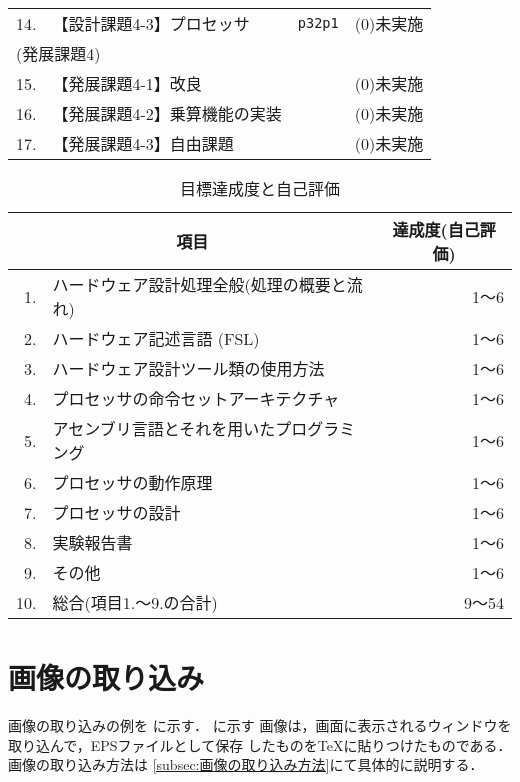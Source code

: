 \documentclass{ujarticle}[11pt]
\newcommand{\figref}[1]{\makebox{図~\ref{#1}}}
\begin{document}
\begin{table}[tb]
\begin{center}
{\begin{tabular}{rll|l}
    14. & 【設計課題4-3】プロセッサ      & \verb|p32p1|          & (0)未実施 \\
    \multicolumn{3}{l|}{(発展課題4)} & \\
    15. & 【発展課題4-1】改良            &                       & (0)未実施 \\
    16. & 【発展課題4-2】乗算機能の実装  &                       & (0)未実施 \\
    17. & 【発展課題4-3】自由課題        &                       & (0)未実施 \\
    \hline
    \end{tabular}
    }
    \end{center}
    \end{table}
     
     
     
    \begin{table}[tb]
    \caption{目標達成度と自己評価}
    \label{tab:目標達成度と自己評価}
    \begin{center}
    {\small
    \begin{tabular}{rl|r}
    \hline
    \hline
    \multicolumn{2}{c|}{項目} & \multicolumn{1}{c}{達成度(自己評価)} \\
    \hline
    1. & ハードウェア設計処理全般(処理の概要と流れ) & 1〜6 \\
    2. & ハードウェア記述言語 (FSL) & 1〜6 \\
    3. & ハードウェア設計ツール類の使用方法 & 1〜6 \\
    4. & プロセッサの命令セットアーキテクチャ & 1〜6 \\
    5. & アセンブリ言語とそれを用いたプログラミング & 1〜6 \\
    6. & プロセッサの動作原理 & 1〜6 \\
    7. & プロセッサの設計 & 1〜6 \\
    8. & 実験報告書 & 1〜6 \\
    9. & その他 & 1〜6 \\
    \hline
    10. & 総合(項目1.〜9.の合計) & 9〜54 \\
    \hline
    \end{tabular}
    }
    \end{center}
    \end{table}
     
     
    \section{画像の取り込み}
    画像の取り込みの例を
    \figref{fig:4ビットカウンタをシミュレーションした際の信号波形}に示す．
    \figref{fig:4ビットカウンタをシミュレーションした際の信号波形}に示す
    画像は，画面に表示されるウィンドウを取り込んで，EPSファイルとして保存
    したものをTeXに貼りつけたものである．画像の取り込み方法は
    \ref{subsec:画像の取り込み方法}にて具体的に説明する．
     
\end{document}

